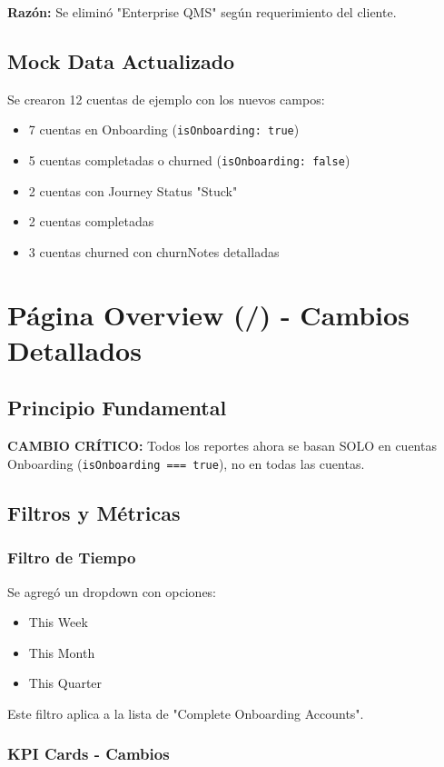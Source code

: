 \documentclass[12pt,a4paper]{article}
\begin{document}
\textbf{Razón:} Se eliminó "Enterprise QMS" según requerimiento del cliente.

\subsection{Mock Data Actualizado}

Se crearon 12 cuentas de ejemplo con los nuevos campos:
\begin{itemize}
    \item 7 cuentas en Onboarding (\texttt{isOnboarding: true})
    \item 5 cuentas completadas o churned (\texttt{isOnboarding: false})
    \item 2 cuentas con Journey Status "Stuck"
    \item 2 cuentas completadas
    \item 3 cuentas churned con churnNotes detalladas
\end{itemize}

\section{Página Overview (/) - Cambios Detallados}

\subsection{Principio Fundamental}
\textbf{CAMBIO CRÍTICO:} Todos los reportes ahora se basan SOLO en cuentas Onboarding (\texttt{isOnboarding === true}), no en todas las cuentas.

\subsection{Filtros y Métricas}

\subsubsection{Filtro de Tiempo}
Se agregó un dropdown con opciones:
\begin{itemize}
    \item This Week
    \item This Month
    \item This Quarter
\end{itemize}

Este filtro aplica a la lista de "Complete Onboarding Accounts".

\subsubsection{KPI Cards - Cambios}
\end{document}
